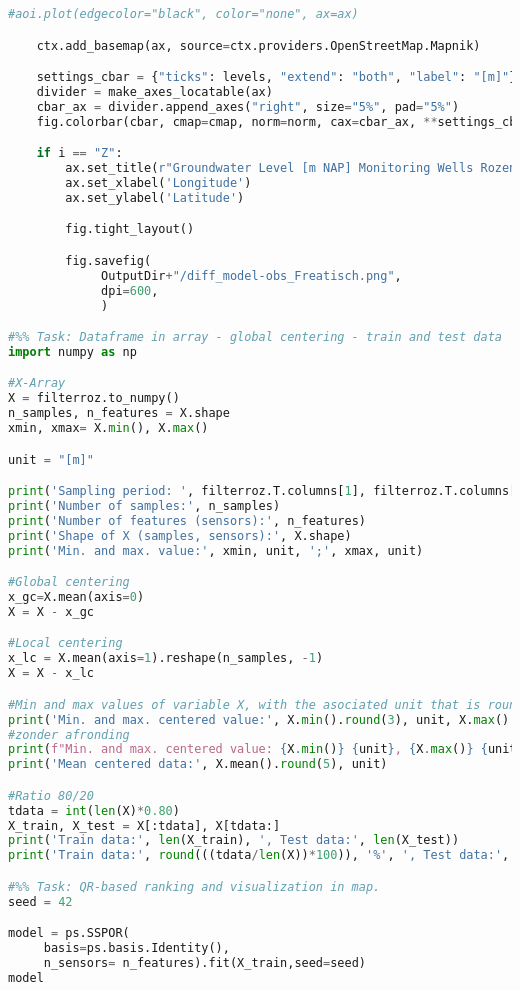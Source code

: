 \begin{lstlisting}[language=Python]
    #aoi.plot(edgecolor="black", color="none", ax=ax)

    ctx.add_basemap(ax, source=ctx.providers.OpenStreetMap.Mapnik)

    settings_cbar = {"ticks": levels, "extend": "both", "label": "[m]"}
    divider = make_axes_locatable(ax)
    cbar_ax = divider.append_axes("right", size="5%", pad="5%")
    fig.colorbar(cbar, cmap=cmap, norm=norm, cax=cbar_ax, **settings_cbar)

    if i == "Z":
        ax.set_title(r"Groundwater Level [m NAP] Monitoring Wells Rozenburg")
        ax.set_xlabel('Longitude')
        ax.set_ylabel('Latitude')

        fig.tight_layout()

        fig.savefig(
             OutputDir+"/diff_model-obs_Freatisch.png",
             dpi=600,
             )

#%% Task: Dataframe in array - global centering - train and test data 
import numpy as np

#X-Array
X = filterroz.to_numpy()
n_samples, n_features = X.shape
xmin, xmax= X.min(), X.max()

unit = "[m]"

print('Sampling period: ', filterroz.T.columns[1], filterroz.T.columns[-1])
print('Number of samples:', n_samples)
print('Number of features (sensors):', n_features)
print('Shape of X (samples, sensors):', X.shape)
print('Min. and max. value:', xmin, unit, ';', xmax, unit)

#Global centering
x_gc=X.mean(axis=0)
X = X - x_gc

#Local centering 
x_lc = X.mean(axis=1).reshape(n_samples, -1)
X = X - x_lc

#Min and max values of variable X, with the asociated unit that is rounded to 3 decimals.
print('Min. and max. centered value:', X.min().round(3), unit, X.max().round(3), unit)
#zonder afronding
print(f"Min. and max. centered value: {X.min()} {unit}, {X.max()} {unit}")
print('Mean centered data:', X.mean().round(5), unit)

#Ratio 80/20
tdata = int(len(X)*0.80)
X_train, X_test = X[:tdata], X[tdata:]
print('Train data:', len(X_train), ', Test data:', len(X_test))
print('Train data:', round(((tdata/len(X))*100)), '%', ', Test data:', 100-round(((tdata/len(X))*100)), '%')

#%% Task: QR-based ranking and visualization in map.
seed = 42 

model = ps.SSPOR(
     basis=ps.basis.Identity(),
     n_sensors= n_features).fit(X_train,seed=seed)
model


\end{lstlisting}
